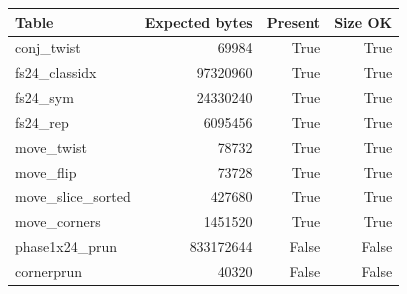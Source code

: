 {\small
\begin{tabular}{lrrr}
\hline
Table & Expected bytes & Present & Size OK \\
\hline
conj\_twist & 69984 & True & True \\
fs24\_classidx & 97320960 & True & True \\
fs24\_sym & 24330240 & True & True \\
fs24\_rep & 6095456 & True & True \\
move\_twist & 78732 & True & True \\
move\_flip & 73728 & True & True \\
move\_slice\_sorted & 427680 & True & True \\
move\_corners & 1451520 & True & True \\
phase1x24\_prun & 833172644 & False & False \\
cornerprun & 40320 & False & False \\
\hline
\end{tabular}
}
